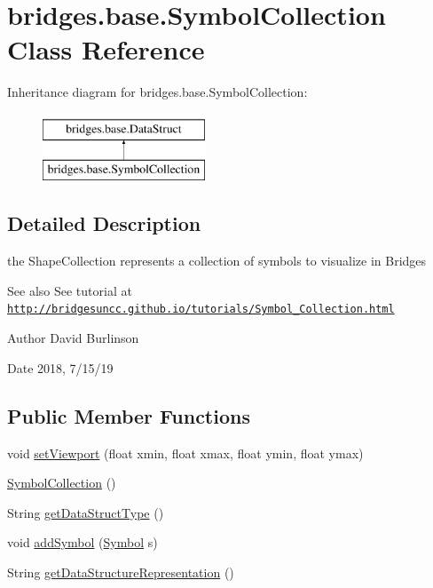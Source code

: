 \hypertarget{classbridges_1_1base_1_1_symbol_collection}{}\section{bridges.\+base.\+Symbol\+Collection Class Reference}
\label{classbridges_1_1base_1_1_symbol_collection}
Inheritance diagram for bridges.\+base.\+Symbol\+Collection\+:\begin{figure}[H]
\begin{center}
\leavevmode
\includegraphics[height=2.000000cm]{classbridges_1_1base_1_1_symbol_collection}
\end{center}
\end{figure}


\subsection{Detailed Description}
the Shape\+Collection represents a collection of symbols to visualize in Bridges 

\begin{DoxySeeAlso}{See also}
See tutorial at \href{http://bridgesuncc.github.io/tutorials/Symbol_Collection.html}{\tt http\+://bridgesuncc.\+github.\+io/tutorials/\+Symbol\+\_\+\+Collection.\+html}
\end{DoxySeeAlso}
\begin{DoxyAuthor}{Author}
David Burlinson 
\end{DoxyAuthor}
\begin{DoxyDate}{Date}
2018, 7/15/19 
\end{DoxyDate}
\subsection*{Public Member Functions}
\begin{DoxyCompactItemize}
\item 
void \hyperlink{classbridges_1_1base_1_1_symbol_collection_a59af7625aad721a9f14ac1fec22c8bde}{set\+Viewport} (float xmin, float xmax, float ymin, float ymax)
\item 
\hyperlink{classbridges_1_1base_1_1_symbol_collection_a8959dab963ce54f56560c6c27a3a3de5}{Symbol\+Collection} ()
\item 
String \hyperlink{classbridges_1_1base_1_1_symbol_collection_afbc928d2e6818edec96d10f52feebacb}{get\+Data\+Struct\+Type} ()
\item 
void \hyperlink{classbridges_1_1base_1_1_symbol_collection_a8e934c53b78b05a7e982f3ff2362adea}{add\+Symbol} (\hyperlink{classbridges_1_1base_1_1_symbol}{Symbol} s)
\item 
String \hyperlink{classbridges_1_1base_1_1_symbol_collection_a706ad8a7bcf12c194403ac3281c73674}{get\+Data\+Structure\+Representation} ()
\end{DoxyCompactItemize}
